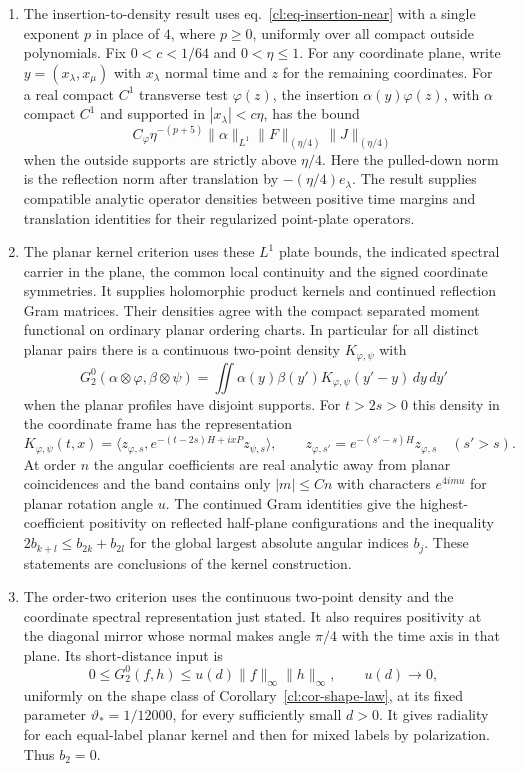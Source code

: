 \documentclass[11pt,letterpaper,reqno]{amsart}
\numberwithin{equation}{section}
\renewcommand{\eqref}[1]{\textup{eq.~\ref{#1}}}
\theoremstyle{definition}
\theoremstyle{remark}
\begin{document}
\begin{enumerate}
\item The insertion-to-density result uses
\eqref{cl:eq-insertion-near} with a single exponent \(p\)
in place of \(4\), where \(p\ge0\), uniformly over all compact
outside polynomials. Fix \(0<c<1/64\) and \(0<\eta\le1\).
For any coordinate plane, write
\(y=(x_\lambda,x_\mu)\) with \(x_\lambda\) normal time
and \(z\) for the remaining coordinates. For a real compact
\(C^1\) transverse test \(\varphi(z)\), the insertion
\(\alpha(y)\varphi(z)\), with \(\alpha\) compact \(C^1\)
and supported in \(|x_\lambda|<c\eta\), has the bound
\[
 C_\varphi \eta^{-(p+5)}\|\alpha\|_{L^1}
         \|F\|_{(\eta/4)}\|J\|_{(\eta/4)}
\]
when the outside supports are strictly above \(\eta/4\).
Here the pulled-down norm is the reflection norm after
translation by \(-(\eta/4)e_\lambda\).
The result supplies compatible analytic operator densities
between positive time margins and translation identities
for their regularized point-plate operators.

\item The planar kernel criterion uses these \(L^1\) plate
bounds, the indicated spectral carrier in the plane, the
common local continuity and the signed coordinate
symmetries. It supplies holomorphic product kernels and
continued reflection Gram matrices. Their densities agree
with the compact separated moment functional on ordinary
planar ordering charts. In particular for all distinct
planar pairs there is a continuous two-point density
\(K_{\varphi,\psi}\) with
\[
 G_2^0(\alpha\otimes\varphi,\beta\otimes\psi)
  =\iint\alpha(y)\beta(y')K_{\varphi,\psi}(y'-y)\,dy\,dy'
\]
when the planar profiles have disjoint supports.
For \(t>2s>0\) this density in the coordinate frame
has the representation
\[
 K_{\varphi,\psi}(t,x)=
   \langle z_{\varphi,s},
     e^{-(t-2s)H+ixP}z_{\psi,s}\rangle,\qquad
 z_{\varphi,s'}=e^{-(s'-s)H}z_{\varphi,s}\quad(s'>s).
\]
At order \(n\) the angular coefficients are real analytic
away from planar coincidences and the band contains only
\(|m|\le Cn\) with characters \(e^{4imu}\) for planar
rotation angle \(u\). The continued Gram identities
give the highest-coefficient positivity on reflected
half-plane configurations and the inequality
\(2b_{k+l}\le b_{2k}+b_{2l}\) for the global largest
absolute angular indices \(b_j\). These statements
are conclusions of the kernel construction.

\item The order-two criterion uses the continuous
two-point density and the coordinate spectral
representation just stated. It also requires
positivity at the diagonal mirror whose normal makes
angle \(\pi/4\) with the time axis in that plane.
Its short-distance input is
\[
 0\le G^0_2(f,h)
      \le u(d)\|f\|_\infty\|h\|_\infty,\qquad u(d)\to0 ,
\]
uniformly on the shape class of
Corollary~\ref{cl:cor-shape-law}, at its fixed
parameter \(\vartheta_*=1/12000\), for every sufficiently
small \(d>0\).
It gives radiality for each equal-label planar kernel
and then for mixed labels by polarization. Thus \(b_2=0\).


\end{enumerate}
\end{document}
